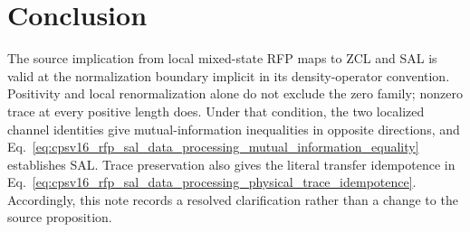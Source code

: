 \documentclass{article}
\begin{document}
\section{Conclusion}

The source implication from local mixed-state RFP maps to ZCL and SAL is valid
at the normalization boundary implicit in its density-operator convention.
Positivity and local renormalization alone do not exclude the zero family;
nonzero trace at every positive length does. Under that condition, the two
localized channel identities give mutual-information inequalities in opposite
directions, and
Eq.~\ref{eq:cpsv16_rfp_sal_data_processing_mutual_information_equality}
establishes SAL. Trace preservation also gives the literal transfer
idempotence in
Eq.~\ref{eq:cpsv16_rfp_sal_data_processing_physical_trace_idempotence}.
Accordingly, this note records a resolved clarification rather than a change to
the source proposition.



\end{document}
